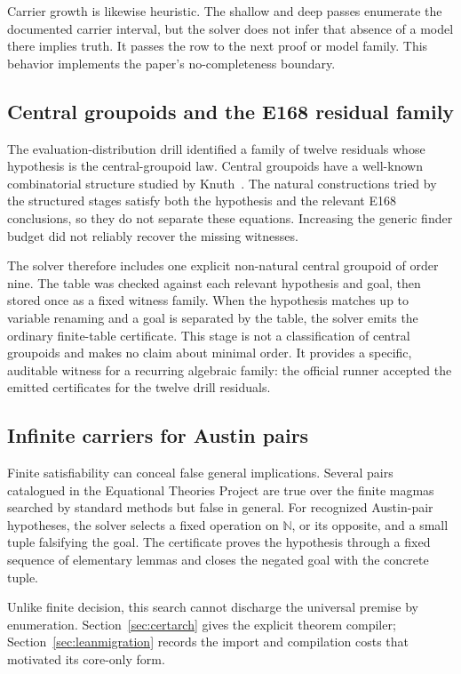 \documentclass[10pt,twocolumn]{article}
\newcommand{\Nat}{\mathbb{N}}
\begin{document}
Carrier growth is likewise heuristic.  The shallow and deep passes enumerate
the documented carrier interval, but the solver does not infer that absence of
a model there implies truth.  It passes the row to the next proof or
model family.  This behavior implements the paper's no-completeness boundary.

\subsection{Central groupoids and the E168 residual family}

The evaluation-distribution drill identified a family of twelve residuals whose
hypothesis is the central-groupoid law.  Central groupoids have a well-known
combinatorial structure studied by Knuth~\cite{knuthCentral}.  The natural
constructions tried by the structured stages satisfy both the hypothesis and
the relevant E168 conclusions, so they do not separate these equations.
Increasing the generic finder budget did not reliably recover the missing witnesses.

The solver therefore includes one explicit non-natural central groupoid of
order nine.  The table was checked against each relevant hypothesis and goal,
then stored once as a fixed witness family.  When the hypothesis matches up
to variable renaming and a goal is separated by the table, the solver emits
the ordinary finite-table certificate.  This stage is not a classification of
central groupoids and makes no claim about minimal order.  It provides a
specific, auditable witness for a recurring algebraic family: the official
runner accepted the emitted certificates for the twelve drill residuals.

\subsection{Infinite carriers for Austin pairs}

Finite satisfiability can conceal false general implications.  Several pairs
catalogued in the Equational Theories Project are true over the finite magmas
searched by standard methods but false in general.  For recognized Austin-pair
hypotheses, the solver selects a fixed operation on $\Nat$, or its opposite,
and a small tuple falsifying the goal.  The certificate proves the hypothesis
through a fixed sequence of elementary lemmas and closes the negated goal with
the concrete tuple.

Unlike finite decision, this search cannot discharge the universal premise by
enumeration.  Section~\ref{sec:certarch} gives the explicit theorem compiler;
Section~\ref{sec:leanmigration} records the import and compilation costs that
motivated its core-only form.
\end{document}
